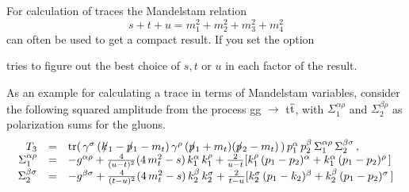 For calculation of traces the Mandelstam relation
\[
s+t+u=m_1^{2} + m_2^{2} + m_3^{2} + m_4^{2}
\]
can often be used to get a compact result.  If you set the option


\fc tries to figure out the best choice of $s, t$ or $u$ in each factor of the result.

As an example for calculating a trace in terms of Mandelstam variables, consider  the following squared amplitude from the process gg $\rightarrow$ t$\overline{\rm t}$, with $\Sigma_1^{\alpha \rho}$ and $\Sigma_2^{\beta \rho}$ as polarization sums for the gluons.
\[
\begin{array}{rcl}
T_3 &=& {\rm tr}(\,\gamma^{\sigma}\,(k \hspace{-1.5mm} /_1 - p \hspace{-1.5mm} /_1 - m_t)\, \gamma^{\rho}\,(p \hspace{-1.5mm} /_1+m_t)
(p \hspace{-1.5mm} /_2 - m_t)\,) \, p_1^{\alpha} \, p_2^{\beta} \, \Sigma_1^{\alpha \rho} \,
\Sigma_2^{\beta \sigma}\,,
\nonumber \\
\Sigma_1^{\alpha \rho}&=& -g^{\alpha \rho} + \frac{4}{(u-t)^{2}} (4\,m_t^{2} - s)\,k_1^{\alpha}\,
k_1^{\rho} + \frac{2}{u-t} [k_1^{\rho}\,(p_1 - p_2)^{\alpha} + 
                 k_1^{\alpha}\,(p_1 - p_2)^{\rho}\,] \nonumber \\
\Sigma_2^{\beta \sigma} &=& -g^{\beta \sigma} + \frac{4}{(t-u)^{2}} (4\,m_t^{2} - s)\,k_2^{\beta}\,
k_2^{\sigma} + \frac{2}{t-u} [k_2^{\sigma}\,(p_1 - k_2)^{\beta} + 
                 k_2^{\beta}\,(p_1 - p_2)^{\sigma}\,] \nonumber 
\end{array}
\]
\beom
{}
